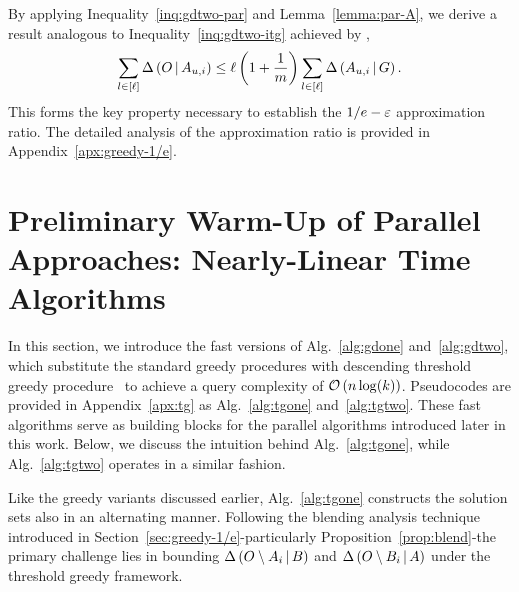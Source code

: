 By applying Inequality~\eqref{inq:gdtwo-par} and Lemma~\ref{lemma:par-A}, 
we derive a result analogous to Inequality~\eqref{inq:gdtwo-itg} achieved by \itg,
\begin{align}
    \sum_{l\in [\ell]}\Delta \left( O \, \middle| \, A_{u, i} \right) \le \ell\left(1+\frac{1}{m}\right)\sum_{l\in [\ell]}\Delta \left( A_{u, i} \, \middle| \, G \right).
\end{align} 
This forms the key property necessary to establish the $1/e-\varepsilon$ approximation ratio.
The detailed analysis of the approximation ratio is provided in Appendix~\ref{apx:greedy-1/e}.

\section{Preliminary Warm-Up of Parallel Approaches: Nearly-Linear Time Algorithms}\label{sec:tg}
In this section, we introduce the fast versions of Alg.~\ref{alg:gdone}
and~\ref{alg:gdtwo},
which substitute the standard greedy procedures
with descending threshold greedy procedure~\citep{DBLP:conf/soda/BadanidiyuruV14}
to achieve a query complexity of $\mathcal O \left( n\log(k) \right)$.
Pseudocodes are provided in Appendix~\ref{apx:tg}
as Alg.~\ref{alg:tgone} and~\ref{alg:tgtwo}.
These fast algorithms serve as building blocks for the parallel algorithms introduced later in this work.
Below, we discuss the intuition behind Alg.~\ref{alg:tgone},
while Alg.~\ref{alg:tgtwo} operates in a similar fashion.

Like the greedy variants discussed earlier,
Alg.~\ref{alg:tgone} constructs the solution sets also in
an alternating manner.
Following the blending analysis technique introduced 
in Section~\ref{sec:greedy-1/e}-particularly Proposition~\ref{prop:blend}-the
primary challenge lies in bounding $\Delta \left( O\setminus A_i \, \middle| \, B \right)$
and $\Delta \left( O\setminus B_i \, \middle| \, A \right)$
under the threshold greedy framework.

